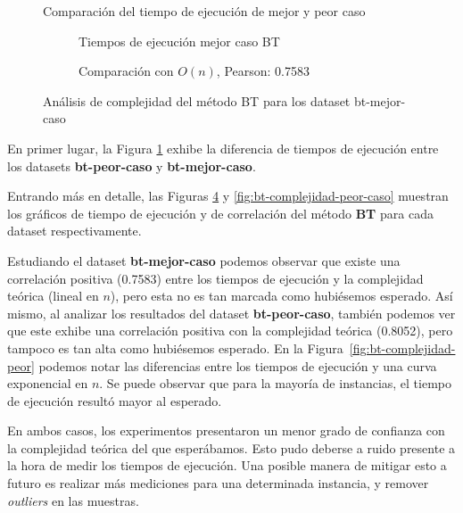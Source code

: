 \documentclass{article}
\begin{document}
\begin{figure}[!ht]
    \centering
    
    \caption{Comparación del tiempo de ejecución de mejor y peor caso}
    \label{fig:bt-complejidad-mejor-peor}
\end{figure}

\begin{figure}[!ht]
    \centering
    \begin{subfigure}[b]{0.45\textwidth}
        \centering
        
        \caption{Tiempos de ejecución mejor caso BT}
        \label{fig:bt-complejidad-mejor}
    \end{subfigure}
    \begin{subfigure}[b]{0.45\textwidth}
        \centering
        
        \caption{Comparación con $O(n)$, Pearson: 0.7583}
        \label{fig:bt-corr-mejor}
    \end{subfigure}
    \caption{Análisis de complejidad del método BT para los dataset bt-mejor-caso}
    \label{fig:bt-complejidad-mejor-caso}
\end{figure}

En primer lugar, la Figura \ref{fig:bt-complejidad-mejor-peor} exhibe la diferencia de tiempos de ejecución entre los datasets \textbf{bt-peor-caso} y \textbf{bt-mejor-caso}.

Entrando más en detalle, las Figuras \ref{fig:bt-complejidad-mejor-caso} y \ref{fig:bt-complejidad-peor-caso} muestran los gráficos de tiempo de ejecución y de correlación del método \textbf{BT} para cada dataset respectivamente.

Estudiando el dataset \textbf{bt-mejor-caso} podemos observar que existe una correlación positiva (0.7583) entre los tiempos de ejecución y la complejidad teórica (lineal en $n$), pero esta no es tan marcada como hubiésemos esperado. Así mismo, al analizar los resultados del dataset \textbf{bt-peor-caso}, también podemos ver que este exhibe una correlación positiva con la complejidad teórica (0.8052), pero tampoco es tan alta como hubiésemos esperado. En la Figura~\ref{fig:bt-complejidad-peor} podemos notar las diferencias entre los tiempos de ejecución y una curva exponencial en $n$. Se puede observar que para la mayoría de instancias, el tiempo de ejecución resultó mayor al esperado.

En ambos casos, los experimentos presentaron un menor grado de confianza con la complejidad teórica del que esperábamos. Esto pudo deberse a ruido presente a la hora de medir los tiempos de ejecución. Una posible manera de mitigar esto a futuro es realizar más mediciones para una determinada instancia, y remover \emph{outliers} en las muestras.
\end{document}
